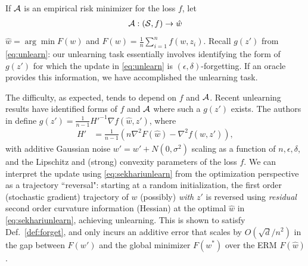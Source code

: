 If $\mathcal{A}$ is an empirical risk minimizer for the loss $f$, let
\begin{align}
\cA : (\cS, f) \rightarrow \hat{w}%
\end{align}
$\hat{w} = \arg\min F(w)$ and $F(w) = \frac{1}{n}\sum_{i=1}^n f(w, z_i).$ 
Recall $g(z')$ from \eqref{eq:unlearn}:  
our unlearning task 
essentially involves 
identifying 
the form of $g(z')$ for which the update in \eqref{eq:unlearn} is $(\epsilon,\delta)$-forgetting. If an oracle provides this information, we have 
accomplished the unlearning task.

The difficulty, 
as expected, tends to 
depend on $f$ and $\mathcal{A}$. 
Recent unlearning results have identified forms of $f$ and $\mathcal{A}$ where such a $g(z')$ exists. The authors in \citep{sekhari2021remember} define $g(z') = \frac{1}{n-1}H'^{-1}\nabla f(\hat{w},z')$, where
\begin{align}\label{eq:sekhariunlearn}
H' &= \frac{1}{n-1} \left(n\nabla^2 F(\hat{w}) - \nabla^2 f(\hat{w},z')\right),
\end{align}
with additive Gaussian noise $w' = w' + N(0,\sigma^2)$ scaling as a function of $n, \epsilon, \delta$, and the Lipschitz and (strong) convexity parameters of the loss $f$. We can interpret the update using \eqref{eq:sekhariunlearn} from the optimization perspective as a trajectory ``reversal": starting at a random initialization, the first order (stochastic gradient) trajectory of  ${w}$ (possibly) {\em with}  $z'$ is reversed using {\em residual} second order curvature information (Hessian) at the optimal $\hat{w}$ in \eqref{eq:sekhariunlearn}, achieving unlearning. This is shown to satisfy Def.~\ref{def:forget}, and only incurs an additive error that scales by $O(\sqrt{d}/n^2)$ in the gap between $F(w')$ and the global minimizer $F(w^*)$ over the ERM $F(\hat{w})$. 

